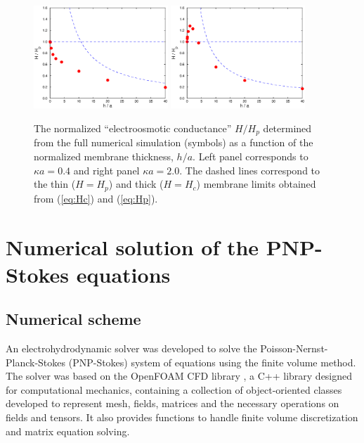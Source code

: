 \begin{figure}[h]
\centering
\includegraphics[width=0.45\textwidth]{zero_thickness/figure3a.eps}
\includegraphics[width=0.45\textwidth]{zero_thickness/figure3b.eps}
\caption{The normalized ``electroosmotic conductance'' $H/H_p$ determined from the full 
numerical simulation (symbols) as a function of the normalized membrane thickness, $h/a$. Left panel corresponds to $\kappa a = 0.4$ and right panel $\kappa a = 2.0$.
The dashed lines correspond to the thin ($H=H_p$) and thick 
($H=H_c$) membrane limits obtained from (\ref{eq:Hc}) and (\ref{eq:Hp}).}
\label{fig:flowConduc}
\end{figure}

\section{Numerical solution of the PNP-Stokes equations}\label{sec:numerical}
\subsection{Numerical scheme}
An electrohydrodynamic solver was developed to solve the Poisson-Nernst-Planck-Stokes (PNP-Stokes) system of equations using the finite volume method. The solver was based on the OpenFOAM CFD library \cite{OPENFOAM}, a C++ library designed for computational mechanics,
containing a collection of object-oriented classes developed to represent mesh, fields, matrices and the necessary operations on fields and tensors. It also provides functions to handle finite volume discretization and matrix equation solving. 

